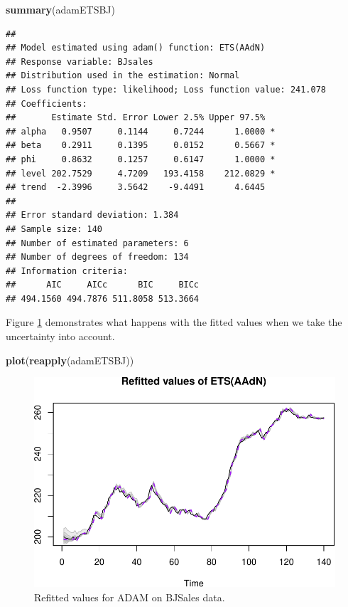 \documentclass[]{book}
\newenvironment{Shaded}{\begin{snugshade}}{\end{snugshade}}
\newcommand{\KeywordTok}[1]{\textcolor[rgb]{0.13,0.29,0.53}{\textbf{#1}}}
\newcommand{\NormalTok}[1]{#1}
\theoremstyle{definition}
\theoremstyle{definition}
\theoremstyle{definition}
\theoremstyle{definition}
\theoremstyle{remark}
\begin{document}
\begin{Shaded}
\begin{Highlighting}[]
\KeywordTok{summary}\NormalTok{(adamETSBJ)}
\end{Highlighting}
\end{Shaded}

\begin{verbatim}
## 
## Model estimated using adam() function: ETS(AAdN)
## Response variable: BJsales
## Distribution used in the estimation: Normal
## Loss function type: likelihood; Loss function value: 241.078
## Coefficients:
##       Estimate Std. Error Lower 2.5% Upper 97.5%  
## alpha   0.9507     0.1144     0.7244      1.0000 *
## beta    0.2911     0.1395     0.0152      0.5667 *
## phi     0.8632     0.1257     0.6147      1.0000 *
## level 202.7529     4.7209   193.4158    212.0829 *
## trend  -2.3996     3.5642    -9.4491      4.6445  
## 
## Error standard deviation: 1.384
## Sample size: 140
## Number of estimated parameters: 6
## Number of degrees of freedom: 134
## Information criteria:
##      AIC     AICc      BIC     BICc 
## 494.1560 494.7876 511.8058 513.3664
\end{verbatim}

Figure \ref{fig:adamModelPIRefitted} demonstrates what happens with the fitted values when we take the uncertainty into account.

\begin{Shaded}
\begin{Highlighting}[]
\KeywordTok{plot}\NormalTok{(}\KeywordTok{reapply}\NormalTok{(adamETSBJ))}
\end{Highlighting}
\end{Shaded}

\begin{figure}
\centering
\includegraphics{Svetunkov--2022----ADAM_files/figure-latex/adamModelPIRefitted-1.pdf}
\caption{\label{fig:adamModelPIRefitted}Refitted values for ADAM on BJSales data.}
\end{figure}
\end{document}
